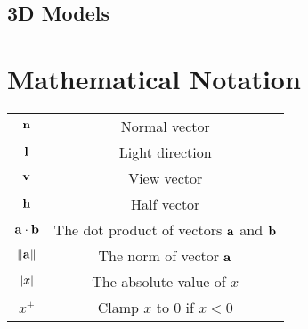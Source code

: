 \begin{appendices}
\section{3D Models}


%
%
\chapter{Mathematical Notation} \label{MathematicalNotation}

\begin{center}
	\begin{tabular}{ c c }
		\hline
		\begin{math}\mathbf{n}\end{math} & Normal vector \\
		\begin{math}\mathbf{l}\end{math} & Light direction \\
		\begin{math}\mathbf{v}\end{math} & View vector \\
		\begin{math}\mathbf{h}\end{math} & Half vector \\
		\begin{math}\mathbf{a}\cdot\mathbf{b}\end{math} & The dot product of vectors \begin{math}\mathbf{a}\end{math} and \begin{math}\mathbf{b}\end{math} \\
		\begin{math}\norm{\mathbf{a}}\end{math} & The norm of vector \begin{math}\mathbf{a}\end{math} \\
		\begin{math}\abs{x}\end{math} & The absolute value of \begin{math}x\end{math} \\
		\begin{math}x^+\end{math} & Clamp \begin{math}x\end{math} to \begin{math}0\end{math} if \begin{math}x<0\end{math} \\

\end{tabular}
\end{center}
\end{appendices}
